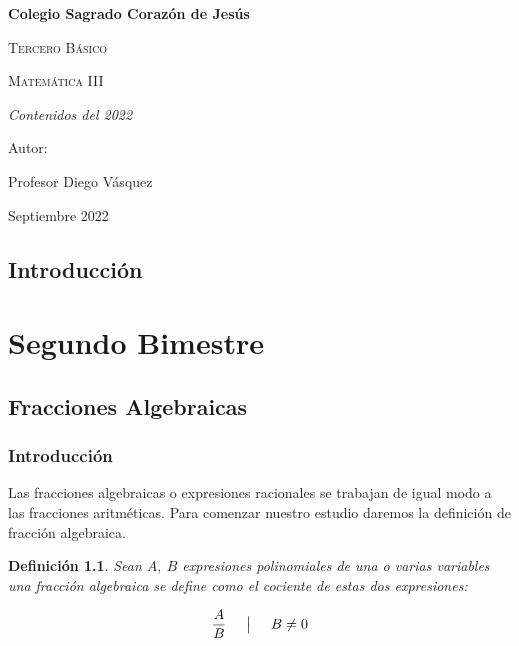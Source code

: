 \documentclass[A4paper, 10pt, oneside]{book}
\newtheorem{definition}{Definición}[chapter]
\begin{document}
	
	\thispagestyle{empty}
	\begin{titlepage}
		\centering
		{\bfseries\LARGE Colegio Sagrado Corazón de Jesús \par}
		\vspace{1cm}
		{\scshape\Large Tercero Básico \par}
		\vspace{3cm}
		{\scshape\Huge Matemática III \par}
		\vspace{3cm}
		{\itshape\Large Contenidos del 2022 \par}
		\vfill
		{\Large Autor: \par}
		{\Large Profesor Diego Vásquez \par}
		\vfill
		{\Large Septiembre 2022 \par}
	\end{titlepage}
	
	\frontmatter
	\tableofcontents
	
	\chapter{Introducción}
	\let\cleardoublepage\clearpage
	
	\mainmatter
	\setcounter{page}{1}
	
	\part{Segundo Bimestre}
	\chapter{Fracciones Algebraicas}
	\section{Introducción}
	Las fracciones algebraicas o expresiones racionales se trabajan de igual modo a las fracciones aritméticas. Para comenzar nuestro estudio daremos la definición de fracción algebraica.
	
	\vspace{5mm}
	
	\begin{definition}
		Sean $A, \ B$ expresiones polinomiales de una o varias variables una fracción algebraica se define como el cociente de estas dos expresiones: 
		
		$$\frac{A}{B} \hspace{5mm} \big| \hspace{5mm}  B\neq 0$$
	\end{definition}
	
\end{document}

